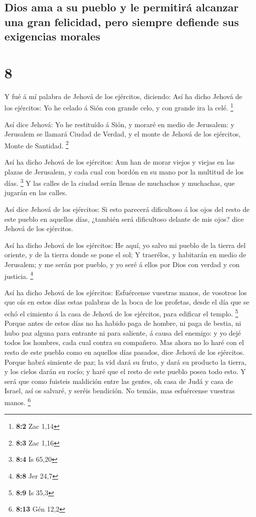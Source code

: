 \hypertarget{dios-ama-a-su-pueblo-y-le-permitiruxe1-alcanzar-una-gran-felicidad-pero-siempre-defiende-sus-exigencias-morales}{%
\subsection{Dios ama a su pueblo y le permitirá alcanzar una gran
felicidad, pero siempre defiende sus exigencias
morales}\label{dios-ama-a-su-pueblo-y-le-permitiruxe1-alcanzar-una-gran-felicidad-pero-siempre-defiende-sus-exigencias-morales}}

\hypertarget{section-7}{%
\section{8}\label{section-7}}

 Y fué á mí palabra de Jehová de los ejércitos, diciendo:
 Así ha dicho Jehová de los ejércitos: Yo he celado á Sión
con grande celo, y con grande ira la celé. \footnote{\textbf{8:2} Zac
  1,14}

 Así dice Jehová: Yo he restituído á Sión, y moraré en medio
de Jerusalem: y Jerusalem se llamará Ciudad de Verdad, y el monte de
Jehová de los ejércitos, Monte de Santidad. \footnote{\textbf{8:3} Zac
  1,16}

 Así ha dicho Jehová de los ejércitos: Aun han de morar
viejos y viejas en las plazas de Jerusalem, y cada cual con bordón en su
mano por la multitud de los días. \footnote{\textbf{8:4} Is 65,20}
 Y las calles de la ciudad serán llenas de muchachos y
muchachas, que jugarán en las calles.

 Así dice Jehová de los ejércitos: Si esto parecerá
dificultoso á los ojos del resto de este pueblo en aquellos días,
¿también será dificultoso delante de mis ojos? dice Jehová de los
ejércitos.

 Así ha dicho Jehová de los ejércitos: He aquí, yo salvo mi
pueblo de la tierra del oriente, y de la tierra donde se pone el sol;
 Y traerélos, y habitarán en medio de Jerusalem; y me serán
por pueblo, y yo seré á ellos por Dios con verdad y con justicia.
\footnote{\textbf{8:8} Jer 24,7}

 Así ha dicho Jehová de los ejércitos: Esfuércense vuestras
manos, de vosotros los que oís en estos días estas palabras de la boca
de los profetas, desde el día que se echó el cimiento á la casa de
Jehová de los ejércitos, para edificar el templo. \footnote{\textbf{8:9}
  Is 35,3}  Porque antes de estos días no ha habido paga de
hombre, ni paga de bestia, ni hubo paz alguna para entrante ni para
saliente, á causa del enemigo: y yo dejé todos los hombres, cada cual
contra su compañero.  Mas ahora no lo haré con el resto de
este pueblo como en aquellos días pasados, dice Jehová de los ejércitos.
 Porque habrá simiente de paz; la vid dará su fruto, y dará
su producto la tierra, y los cielos darán su rocío; y haré que el resto
de este pueblo posea todo esto.  Y será que como fuisteis
maldición entre las gentes, oh casa de Judá y casa de Israel, así os
salvaré, y seréis bendición. No temáis, mas esfuércense vuestras manos.
\footnote{\textbf{8:13} Gén 12,2}

